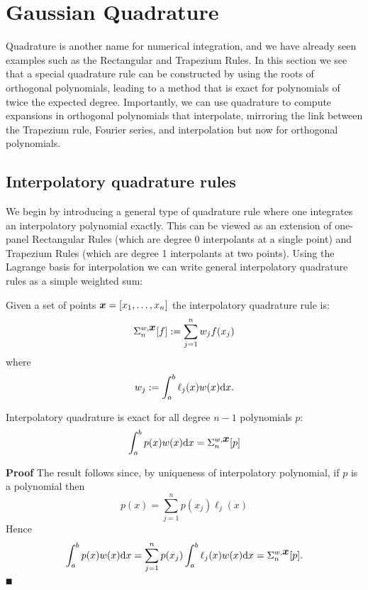 
\section{Gaussian Quadrature}
Quadrature is another name for numerical integration, and we have already seen examples such as the Rectangular and Trapezium Rules. In this section we see that a special quadrature rule can be constructed by using the roots of orthogonal polynomials, leading to a method that is exact for polynomials of twice the expected degree. Importantly, we can use quadrature to compute expansions in orthogonal polynomials that interpolate,  mirroring the link between the Trapezium rule, Fourier series, and interpolation but now for orthogonal polynomials.

\subsection{Interpolatory quadrature rules}
We begin by introducing a general type of quadrature rule where one integrates an interpolatory polynomial exactly. This can be viewed as an extension of one-panel Rectangular Rules (which are degree 0 interpolants at a single point) and Trapezium Rules (which are degree 1 interpolants at two points).  Using the Lagrange basis for interpolation we can write general interpolatory quadrature rules as a simple weighted sum:

\begin{definition} Given a set of points $\bm{{\mbox{\boldmath$x$\unboldmath}}} = [x_1,\ldots,x_n]$ the interpolatory quadrature rule is:
\[
\Sigma_n^{w,\bm{{\mbox{\boldmath$x$\unboldmath}}}}[f] := \sum_{j=1}^n w_j f(x_j)
\]
where
\[
w_j := \ensuremath{\int}_a^b \ensuremath{\ell}_j(x) w(x) {\rm d} x.
\]
\end{definition}

\begin{proposition}  Interpolatory quadrature is exact for all degree $n-1$ polynomials $p$:
\[
\int_a^b p(x) w(x) {\rm d}x = \Sigma_n^{w,\bm{{\mbox{\boldmath$x$\unboldmath}}}}[p]
\]
\end{proposition}
\textbf{Proof} The result follows since, by uniqueness of interpolatory polynomial, if $p$ is a polynomial then
\[
p(x) = \ensuremath{\sum}_{j=1}^n p(x_j) \ensuremath{\ell}_j(x)
\]
Hence
\[
\int_a^b p(x) w(x) {\rm d}x = \sum_{j=1}^n p(x_j) \int_a^b \ell_j(x) w(x) {\rm d}x = \Sigma_n^{w,\bm{{\mbox{\boldmath$x$\unboldmath}}}}[p].
\]
\ensuremath{\QED}

